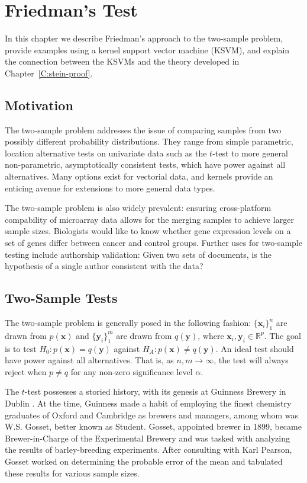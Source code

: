 \graphicspath{{./friedman-test/img/}}
\chapter{Friedman's Test}
\label{C:friedman-test}
In this chapter we describe Friedman's approach to the two-sample
problem, provide examples using a kernel support vector machine (KSVM), and
explain the connection between the KSVMs and the theory developed in
Chapter~\ref{C:stein-proof}.

\section{Motivation}
The two-sample problem addresses the issue of comparing samples from
two possibly different probability distributions.  They range from
simple parametric, location alternative tests on univariate data such as the
$t$-test to more general non-parametric, asymptotically consistent tests, which
have power against all alternatives.  Many options exist for vectorial
data, and kernels provide an enticing avenue for extensions to more
general data types.

The two-sample problem is also widely prevalent: ensuring
cross-platform compability of microarray data allows for the merging
samples to achieve larger sample sizes.  Biologists would like to know
whether gene expression levels on a set of genes differ between cancer
and control groups.  Further uses for two-sample testing include
authorship validation: Given two sets of documents, is the hypothesis
of a single author consistent with the data?

\section{Two-Sample Tests}
The two-sample problem is generally posed in the following fashion: $\{
\mathbf{x}_i\}_1^n$ are drawn from $p(\mathbf{x})$ and
$\{\mathbf{y}_i\}_1^m$ are drawn from $q(\mathbf{y})$, where $\mathbf{x}_i,
\mathbf{y}_i \in \mathbb{R}^p$. The goal is to test $H_0:
p(\mathbf{x}) = q(\mathbf{y})$ against $H_A: p(\mathbf{x}) \neq
q(\mathbf{y})$. An ideal test should have power against all
alternatives. That is, as $n,m \to \infty$, the test
will always reject when $p \neq q$ for any non-zero significance level
$\alpha$.

The $t$-test possesses a storied history, with its genesis at Guinness
Brewery in Dublin \cite{box1987guinness}.  At the time, Guinness made
a habit of employing the finest chemistry graduates of Oxford and
Cambridge as brewers and managers, among whom was W.S. Gosset, better
known as Student.  Gosset, appointed brewer in 1899, became
Brewer-in-Charge of the Experimental Brewery and was tasked with
analyzing the results of barley-breeding experiments.  After
consulting with Karl Pearson, Gosset worked on determining the
probable error of the mean and tabulated these results for various
sample sizes.

